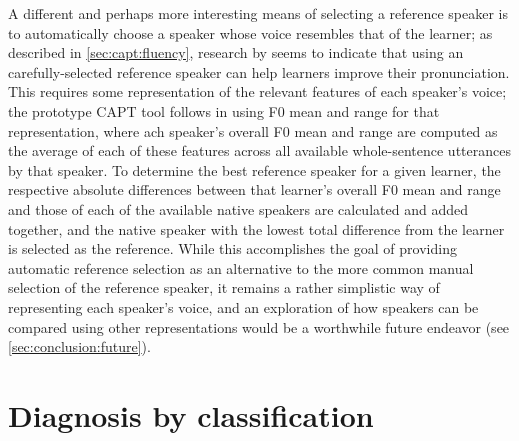 		A different and perhaps more interesting means of selecting a reference speaker is to automatically choose a speaker whose voice resembles
that of the learner; as described in \cref{sec:capt:fluency}, research by \textcite{Probst2002} seems to indicate that using an carefully-selected reference speaker can help learners improve their pronunciation. 
	This requires some representation of the relevant features of each speaker's voice; the prototype CAPT tool follows \textcite{Probst2002} in using F0 mean and range for that representation, where ach speaker's overall F0 mean and range are computed as the average of each of these features across all available whole-sentence utterances by that speaker. To determine the best reference speaker for a given learner, the respective absolute differences between that learner's overall F0 mean and range and those of each of the available native speakers are calculated and added together, and the native speaker with the lowest total difference from the learner is selected as the reference. While this accomplishes the goal of providing automatic reference selection as an alternative to the more common manual selection of the reference speaker, it remains a rather simplistic way of representing each speaker's voice, and an exploration of how speakers can be compared using other representations would be a worthwhile future endeavor (see \cref{sec:conclusion:future}).


	
	

	\section{Diagnosis by classification}
	\label{sec:diag:classification}
	
